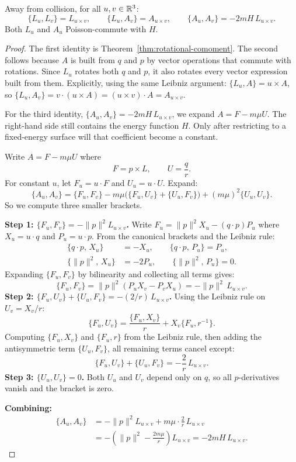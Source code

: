 \begin{theorem}\label{thm:la-poisson}
Away from collision, for all $u, v \in \mathbb{R}^3$:
\[
  \{L_u, L_v\} = L_{u \times v},
  \qquad
  \{L_u, A_v\} = A_{u \times v},
  \qquad
  \{A_u, A_v\} = -2mH\,L_{u \times v}.
\]
Both $L_u$ and $A_u$ Poisson-commute with $H$.
\leanok
\begin{proof}
The first identity is Theorem~\ref{thm:rotational-comoment}.
The second follows because $A$ is built from $q$ and $p$ by vector operations that commute with rotations.
Since $L_u$ rotates both $q$ and $p$, it also rotates every vector expression built from them.
Explicitly, using the same Leibniz argument:
$\{L_u, A\} = u \times A$, so $\{L_u, A_v\} = v \cdot (u \times A) = (u \times v) \cdot A = A_{u \times v}$.

For the third identity, $\{A_u, A_v\} = -2mH\,L_{u \times v}$, we expand $A = F - m\mu U$.
The right-hand side still contains the energy function $H$.
Only after restricting to a fixed-energy surface will that coefficient become a constant.

Write $A = F - m\mu U$ where
\[
  F = p \times L,
  \qquad
  U = \frac{q}{r}.
\]
For constant $u$, let $F_u = u \cdot F$ and $U_u = u \cdot U$.
Expand:
\[
  \{A_u, A_v\}
  = \{F_u, F_v\} - m\mu\bigl(\{F_u, U_v\} + \{U_u, F_v\}\bigr) + (m\mu)^2\{U_u, U_v\}.
\]
So we compute three smaller brackets.

\textbf{Step 1: $\{F_u, F_v\} = -\|p\|^2 L_{u \times v}$.}
Write $F_u = \|p\|^2 X_u - (q \cdot p) P_u$ where $X_u = u \cdot q$ and $P_u = u \cdot p$.
From the canonical brackets and the Leibniz rule:
\begin{align*}
  \{q \cdot p,\, X_u\} &= -X_u, \qquad \{q \cdot p,\, P_u\} = P_u, \\
  \{\|p\|^2,\, X_u\}  &= -2P_u, \qquad \{\|p\|^2,\, P_u\} = 0.
\end{align*}
Expanding $\{F_u, F_v\}$ by bilinearity and collecting all terms gives:
\[
  \{F_u, F_v\} = \|p\|^2(P_u X_v - P_v X_u) = -\|p\|^2\,L_{u \times v}.
\]
\textbf{Step 2: $\{F_u, U_v\} + \{U_u, F_v\} = -(2/r)\,L_{u \times v}$.}
Using the Leibniz rule on $U_v = X_v/r$:
\[
  \{F_u, U_v\} = \frac{\{F_u, X_v\}}{r} + X_v\{F_u, r^{-1}\}.
\]
Computing $\{F_u, X_v\}$ and $\{F_u, r\}$ from the Leibniz rule, then adding the antisymmetric term $\{U_u, F_v\}$, all remaining terms cancel except:
\[
  \{F_u, U_v\} + \{U_u, F_v\} = -\frac{2}{r}\,L_{u \times v}.
\]
\textbf{Step 3: $\{U_u, U_v\} = 0$.}
Both $U_u$ and $U_v$ depend only on $q$, so all $p$-derivatives vanish and the bracket is zero.

\textbf{Combining:}
\begin{align*}
  \{A_u, A_v\}
  &= -\|p\|^2 L_{u \times v} + m\mu \cdot \frac{2}{r}\,L_{u \times v} \\
  &= -\!\left(\|p\|^2 - \frac{2m\mu}{r}\right)L_{u \times v}
   = -2mH\,L_{u \times v}.
\end{align*}
\end{proof}
\end{theorem}

